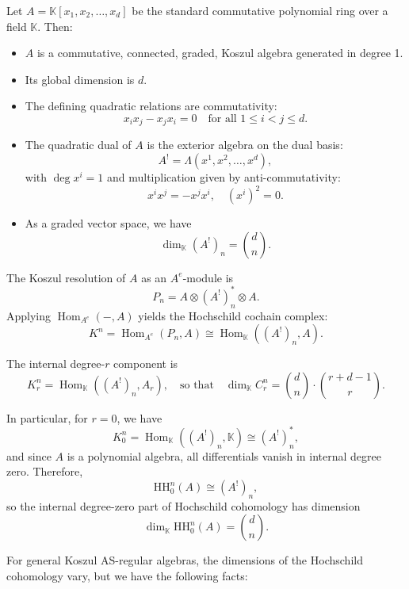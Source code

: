 \documentclass{amsart}
\DeclareMathOperator{\Hom}{Hom}
\begin{document}
\begin{example} \label{example:hochschild}
\setcounter{equation}{0}
Let 
$
A = \mathbb{K}[x_1, x_2, \ldots, x_d]
$
be the standard commutative polynomial ring over a field \( \mathbb{K} \). Then:

\begin{itemize}[leftmargin=*]
    \item \( A \) is a commutative, connected, graded, Koszul algebra generated in degree 1.  
    \item Its global dimension is \( d \).  
    \item The defining quadratic relations are commutativity:
    \[
    x_i x_j - x_j x_i = 0 \quad \text{for all } 1 \leq i < j \leq d.
    \]
    \item The quadratic dual of \( A \) is the exterior algebra on the dual basis:
    \[
    A^! = \Lambda(x^1, x^2, \ldots, x^d),
    \]
    with \( \deg x^i = 1 \) and multiplication given by anti-commutativity:
    \[
    x^i x^j = - x^j x^i, \quad (x^i)^2 = 0.
    \]
    \item As a graded vector space, we have
    \[
    \dim_{\mathbb{K}} (A^!)_n = \binom{d}{n}.
    \]
\end{itemize}

The Koszul resolution of \( A \) as an \( A^e \)-module is
\[
P_n = A \otimes (A^!)_n^* \otimes A.
\]
Applying \( \Hom_{A^e}(-, A) \) yields the Hochschild cochain complex:
\begin{equation} \label{eq:cochain complex}
K^n = \Hom_{A^e}(P_n, A) \cong \Hom_{\mathbb{K}}((A^!)_n, A).
\end{equation}

The internal degree-\( r \) component is
\[
K^n_r = \Hom_{\mathbb{K}}((A^!)_n, A_r),
\quad \text{so that} \quad
\dim_{\mathbb{K}} C^n_r = \binom{d}{n} \cdot \binom{r + d - 1}{r}.
\]

In particular, for \( r = 0 \), we have
\[
K^n_0 = \Hom_{\mathbb{K}}((A^!)_n, \mathbb{K}) \cong (A^!)_n^*,
\]
and since \( A \) is a polynomial algebra, all differentials vanish in internal degree zero. Therefore,
\[
\mathrm{HH}^n_0(A) \cong (A^!)_n,
\]
so the internal degree-zero part of Hochschild cohomology has dimension
\[
\dim_{\mathbb{K}} \mathrm{HH}^n_0(A) = \binom{d}{n}.
\]
\end{example}


For general Koszul AS-regular algebras, the dimensions of the Hochschild cohomology vary, but we have the following facts:
\end{document}
